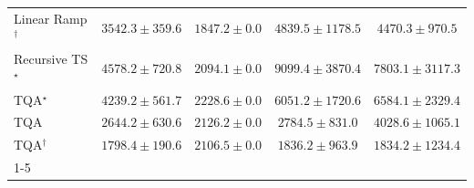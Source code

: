 \begin{tabular}{l|cccc|}
Linear Ramp$^\dagger$ & {\cellcolor[HTML]{D2D3E7}} \color[HTML]{000000} $3542.3\pm 359.6$ & {\cellcolor[HTML]{FDF5FA}} \color[HTML]{000000} $1847.2\pm 0.0$ & {\cellcolor[HTML]{97B7D7}} \color[HTML]{000000} $4839.5\pm 1178.5$ & {\cellcolor[HTML]{A9BFDC}} \color[HTML]{000000} $4470.3\pm 970.5$ \\
Recursive TS$^\star$ & {\cellcolor[HTML]{A5BDDB}} \color[HTML]{000000} $4578.2\pm 720.8$ & {\cellcolor[HTML]{F8F1F8}} \color[HTML]{000000} $2094.1\pm 0.0$ & {\cellcolor[HTML]{023E62}} \color[HTML]{F1F1F1} $9099.4\pm 3870.4$ & {\cellcolor[HTML]{0567A1}} \color[HTML]{F1F1F1} $7803.1\pm 3117.3$ \\
TQA$^\star$ & {\cellcolor[HTML]{B4C4DF}} \color[HTML]{000000} $4239.2\pm 561.7$ & {\cellcolor[HTML]{F5EEF6}} \color[HTML]{000000} $2228.6\pm 0.0$ & {\cellcolor[HTML]{509AC6}} \color[HTML]{F1F1F1} $6051.2\pm 1720.6$ & {\cellcolor[HTML]{2F8BBE}} \color[HTML]{F1F1F1} $6584.1\pm 2329.4$ \\
TQA & {\cellcolor[HTML]{EDE7F2}} \color[HTML]{000000} $2644.2\pm 630.6$ & {\cellcolor[HTML]{F7F0F7}} \color[HTML]{000000} $2126.2\pm 0.0$ & {\cellcolor[HTML]{E8E4F0}} \color[HTML]{000000} $2784.5\pm 831.0$ & {\cellcolor[HTML]{BDC8E1}} \color[HTML]{000000} $4028.6\pm 1065.1$ \\
TQA$^\dagger$ & {\cellcolor[HTML]{FEF6FA}} \color[HTML]{000000} $1798.4\pm 190.6$ & {\cellcolor[HTML]{F7F0F7}} \color[HTML]{000000} $2106.5\pm 0.0$ & {\cellcolor[HTML]{FDF5FA}} \color[HTML]{000000} $1836.2\pm 963.9$ & {\cellcolor[HTML]{FDF5FA}} \color[HTML]{000000} $1834.2\pm 1234.4$ \\
\cline{1-5}
\bottomrule
\end{tabular}
